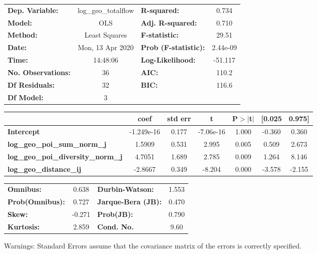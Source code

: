 \begin{center}
\begin{tabular}{lclc}
\toprule
\textbf{Dep. Variable:}                    & log\_geo\_totalflow & \textbf{  R-squared:         } &     0.734   \\
\textbf{Model:}                            &         OLS         & \textbf{  Adj. R-squared:    } &     0.710   \\
\textbf{Method:}                           &    Least Squares    & \textbf{  F-statistic:       } &     29.51   \\
\textbf{Date:}                             &   Mon, 13 Apr 2020  & \textbf{  Prob (F-statistic):} &  2.44e-09   \\
\textbf{Time:}                             &       14:48:06      & \textbf{  Log-Likelihood:    } &   -51.117   \\
\textbf{No. Observations:}                 &            36       & \textbf{  AIC:               } &     110.2   \\
\textbf{Df Residuals:}                     &            32       & \textbf{  BIC:               } &     116.6   \\
\textbf{Df Model:}                         &             3       & \textbf{                     } &             \\
\bottomrule
\end{tabular}
\begin{tabular}{lcccccc}
                                           & \textbf{coef} & \textbf{std err} & \textbf{t} & \textbf{P$> |$t$|$} & \textbf{[0.025} & \textbf{0.975]}  \\
\midrule
\textbf{Intercept}                         &   -1.249e-16  &        0.177     & -7.06e-16  &         1.000        &       -0.360    &        0.360     \\
\textbf{log\_geo\_poi\_sum\_norm\_j}       &       1.5909  &        0.531     &     2.995  &         0.005        &        0.509    &        2.673     \\
\textbf{log\_geo\_poi\_diversity\_norm\_j} &       4.7051  &        1.689     &     2.785  &         0.009        &        1.264    &        8.146     \\
\textbf{log\_geo\_distance\_ij}            &      -2.8667  &        0.349     &    -8.204  &         0.000        &       -3.578    &       -2.155     \\
\bottomrule
\end{tabular}
\begin{tabular}{lclc}
\textbf{Omnibus:}       &  0.638 & \textbf{  Durbin-Watson:     } &    1.553  \\
\textbf{Prob(Omnibus):} &  0.727 & \textbf{  Jarque-Bera (JB):  } &    0.470  \\
\textbf{Skew:}          & -0.271 & \textbf{  Prob(JB):          } &    0.790  \\
\textbf{Kurtosis:}      &  2.859 & \textbf{  Cond. No.          } &     9.60  \\
\bottomrule
\end{tabular}
\end{center}

Warnings: \newline
 [1] Standard Errors assume that the covariance matrix of the errors is correctly specified.